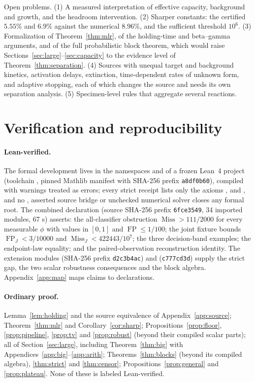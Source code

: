 \documentclass[11pt,a4paper]{article}
\theoremstyle{plain}
\theoremstyle{definition}
\theoremstyle{remark}
\newcommand{\FP}{\operatorname{FP}}
\newcommand{\Miss}{\operatorname{Miss}}
\begin{document}
Open problems. (1) A measured interpretation of effective capacity, background and growth, and the headroom intervention. (2) Sharper constants: the certified $5.55\%$ and $6.9\%$ against the numerical $8.96\%$, and the sufficient threshold $10^{6}$. (3) Formalization of Theorem~\ref{thm:mlr}, of the holding-time and beta--gamma arguments, and of the full probabilistic block theorem, which would raise Sections~\ref{sec:large}--\ref{sec:capacity} to the evidence level of Theorem~\ref{thm:separation}. (4) Sources with unequal target and background kinetics, activation delays, extinction, time-dependent rates of unknown form, and adaptive stopping, each of which changes the source and needs its own separation analysis. (5) Specimen-level rules that aggregate several reactions.

\section{Verification and reproducibility}\label{sec:verification}
\paragraph{Lean-verified.}
The formal development lives in the namespaces  and  of a frozen Lean~4 project (toolchain , pinned Mathlib manifest with SHA-256 prefix \texttt{a8df0b60}), compiled with warnings treated as errors; every strict receipt lists only the axioms ,  and , and no , asserted source bridge or unchecked numerical solver closes any formal root. The combined declaration  (source SHA-256 prefix \texttt{6fce3549}, 34 imported modules, 67 s) asserts: the all-classifier obstruction $\Miss>111/2000$ for every measurable $\phi$ with values in $[0,1]$ and $\FP\le1/100$; the joint fixture bounds $\FP_J<3/10000$ and $\Miss_J<422443/10^{7}$; the three decision-band examples; the endpoint-law equality; and the paired-observation reconstruction identity. The extension modules  (SHA-256 prefix \texttt{d2c3b4ac}) and  (\texttt{c777cd3d}) supply the strict gap, the two scalar robustness consequences and the block algebra. Appendix~\ref{app:map} maps claims to declarations.

\paragraph{Ordinary proof.}
Lemma~\ref{lem:holding} and the source equivalence of Appendix~\ref{app:source}; Theorem~\ref{thm:mlr} and Corollary~\ref{cor:sharp}; Propositions~\ref{prop:floor}, \ref{prop:pipeline}, \ref{prop:tv} and \ref{prop:robust} (beyond their compiled scalar parts); all of Section~\ref{sec:large}, including Theorem~\ref{thm:big} with Appendices~\ref{app:big}--\ref{app:arith}; Theorems~\ref{thm:blocks} (beyond its compiled algebra), \ref{thm:strict} and \ref{thm:censor}; Propositions~\ref{prop:general} and \ref{prop:plateau}. None of these is labeled Lean-verified.
\end{document}
